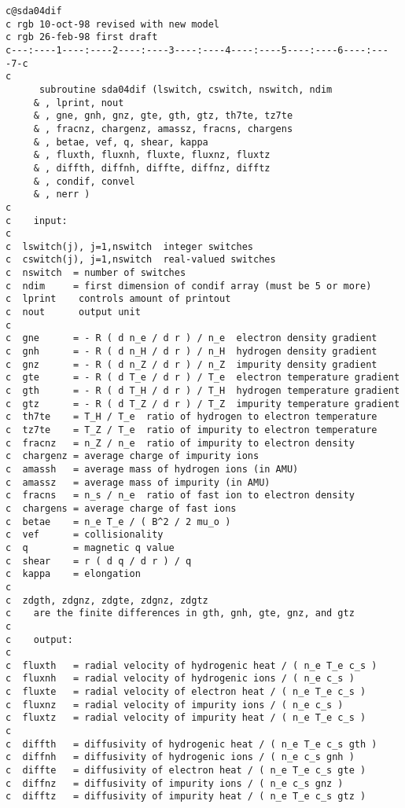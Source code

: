 \begin{verbatim}
c@sda04dif
c rgb 10-oct-98 revised with new model
c rgb 26-feb-98 first draft
c---:----1----:----2----:----3----:----4----:----5----:----6----:----7-c
c
      subroutine sda04dif (lswitch, cswitch, nswitch, ndim
     & , lprint, nout
     & , gne, gnh, gnz, gte, gth, gtz, th7te, tz7te
     & , fracnz, chargenz, amassz, fracns, chargens
     & , betae, vef, q, shear, kappa
     & , fluxth, fluxnh, fluxte, fluxnz, fluxtz
     & , diffth, diffnh, diffte, diffnz, difftz
     & , condif, convel
     & , nerr )
c
c    input:
c
c  lswitch(j), j=1,nswitch  integer switches
c  cswitch(j), j=1,nswitch  real-valued switches
c  nswitch  = number of switches
c  ndim     = first dimension of condif array (must be 5 or more)
c  lprint    controls amount of printout
c  nout      output unit
c
c  gne      = - R ( d n_e / d r ) / n_e  electron density gradient
c  gnh      = - R ( d n_H / d r ) / n_H  hydrogen density gradient
c  gnz      = - R ( d n_Z / d r ) / n_Z  impurity density gradient
c  gte      = - R ( d T_e / d r ) / T_e  electron temperature gradient
c  gth      = - R ( d T_H / d r ) / T_H  hydrogen temperature gradient
c  gtz      = - R ( d T_Z / d r ) / T_Z  impurity temperature gradient
c  th7te    = T_H / T_e  ratio of hydrogen to electron temperature
c  tz7te    = T_Z / T_e  ratio of impurity to electron temperature
c  fracnz   = n_Z / n_e  ratio of impurity to electron density
c  chargenz = average charge of impurity ions
c  amassh   = average mass of hydrogen ions (in AMU)
c  amassz   = average mass of impurity (in AMU)
c  fracns   = n_s / n_e  ratio of fast ion to electron density
c  chargens = average charge of fast ions
c  betae    = n_e T_e / ( B^2 / 2 mu_o )
c  vef      = collisionality
c  q        = magnetic q value
c  shear    = r ( d q / d r ) / q
c  kappa    = elongation
c
c  zdgth, zdgnz, zdgte, zdgnz, zdgtz
c    are the finite differences in gth, gnh, gte, gnz, and gtz
c
c    output:
c
c  fluxth   = radial velocity of hydrogenic heat / ( n_e T_e c_s )
c  fluxnh   = radial velocity of hydrogenic ions / ( n_e c_s )
c  fluxte   = radial velocity of electron heat / ( n_e T_e c_s )
c  fluxnz   = radial velocity of impurity ions / ( n_e c_s )
c  fluxtz   = radial velocity of impurity heat / ( n_e T_e c_s )
c
c  diffth   = diffusivity of hydrogenic heat / ( n_e T_e c_s gth )
c  diffnh   = diffusivity of hydrogenic ions / ( n_e c_s gnh )
c  diffte   = diffusivity of electron heat / ( n_e T_e c_s gte )
c  diffnz   = diffusivity of impurity ions / ( n_e c_s gnz )
c  difftz   = diffusivity of impurity heat / ( n_e T_e c_s gtz )

\end{verbatim}
